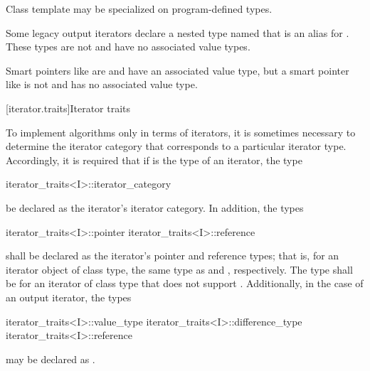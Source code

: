 \pnum
Class template  may be specialized
on program-defined types.

\pnum
\begin{note}
Some legacy output iterators declare a nested type named 
that is an alias for .
These types are not 
and have no associated value types.
\end{note}

\pnum
\begin{note}
Smart pointers like  are  and
have an associated value type, but a smart pointer like 
is not  and has no associated value type.
\end{note}

[iterator.traits]{Iterator traits}

\pnum
{}%
To implement algorithms only in terms of iterators, it is sometimes necessary to
determine the iterator category that corresponds to a particular iterator type.
Accordingly, it is required that if
is the type of an iterator,
the type
%
\begin{codeblock}
iterator_traits<I>::iterator_category
\end{codeblock}
be declared as the iterator's iterator category.
In addition, the types
%
%
\begin{codeblock}
iterator_traits<I>::pointer
iterator_traits<I>::reference
\end{codeblock}
shall be declared as the iterator's pointer and reference types;
that is, for an
iterator object  of class type,
the same type as
 and
,
respectively.
The type
shall be 
for an iterator of class type 
that does not support .
Additionally, in the case of an output iterator, the types
%
%
%
\begin{codeblock}
iterator_traits<I>::value_type
iterator_traits<I>::difference_type
iterator_traits<I>::reference
\end{codeblock}
may be declared as .

